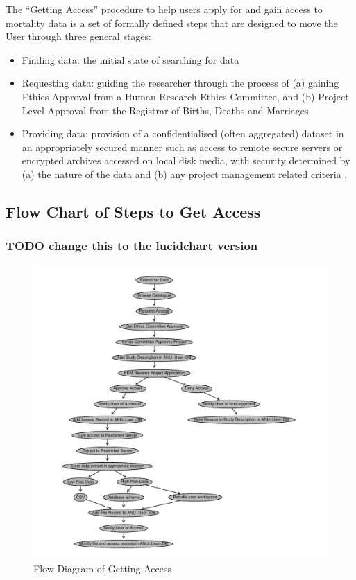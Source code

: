 \documentclass[a4paper]{article}
\begin{document}
The ``Getting Access'' procedure to help users apply for and gain access to mortality data is a set of formally defined steps that are designed to move the User through three general stages:
\begin{itemize}
\item Finding data: the initial state of searching for data
\item Requesting data: guiding the researcher through the process of (a) gaining Ethics Approval from a Human Research Ethics Committee, and (b) Project Level Approval from the Registrar of Births, Deaths and Marriages.
\item Providing data: provision of a confidentialised (often aggregated) dataset in an appropriately secured manner such as access to remote secure servers or encrypted archives accessed on local disk media, with security determined by (a) the nature of the data and (b) any project management related criteria .
\end{itemize}
\subsection{Flow Chart of Steps to Get Access}
\label{sec-3-1}
\subsubsection{\textbf{TODO} change this to the lucidchart version}
\label{sec-3-1-1}

\begin{figure}[!h]
\centering
\includegraphics[width=\textwidth]{DataAccessFlowDiagram-GettingAccess.pdf}
\caption{Flow Diagram of Getting Access}
\label{fig:DataAccessFlowDiagram-GettingAccess}
\end{figure}
\clearpage
\end{document}
